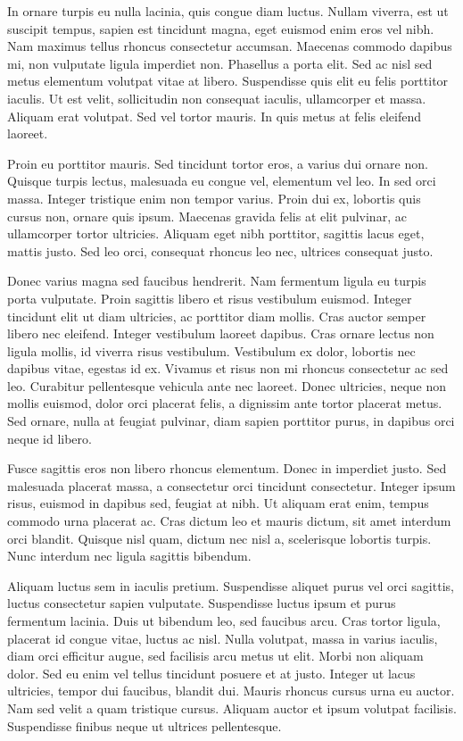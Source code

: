 \documentclass[a4paper,15pt]{article}
\begin{document}
In ornare turpis eu nulla lacinia, quis congue diam luctus. Nullam viverra, est ut suscipit tempus, sapien est tincidunt magna, eget euismod enim eros vel nibh. Nam maximus tellus rhoncus consectetur accumsan. Maecenas commodo dapibus mi, non vulputate ligula imperdiet non. Phasellus a porta elit. Sed ac nisl sed metus elementum volutpat vitae at libero. Suspendisse quis elit eu felis porttitor iaculis. Ut est velit, sollicitudin non consequat iaculis, ullamcorper et massa. Aliquam erat volutpat. Sed vel tortor mauris. In quis metus at felis eleifend laoreet.

Proin eu porttitor mauris. Sed tincidunt tortor eros, a varius dui ornare non. Quisque turpis lectus, malesuada eu congue vel, elementum vel leo. In sed orci massa. Integer tristique enim non tempor varius. Proin dui ex, lobortis quis cursus non, ornare quis ipsum. Maecenas gravida felis at elit pulvinar, ac ullamcorper tortor ultricies. Aliquam eget nibh porttitor, sagittis lacus eget, mattis justo. Sed leo orci, consequat rhoncus leo nec, ultrices consequat justo.

Donec varius magna sed faucibus hendrerit. Nam fermentum ligula eu turpis porta vulputate. Proin sagittis libero et risus vestibulum euismod. Integer tincidunt elit ut diam ultricies, ac porttitor diam mollis. Cras auctor semper libero nec eleifend. Integer vestibulum laoreet dapibus. Cras ornare lectus non ligula mollis, id viverra risus vestibulum. Vestibulum ex dolor, lobortis nec dapibus vitae, egestas id ex. Vivamus et risus non mi rhoncus consectetur ac sed leo. Curabitur pellentesque vehicula ante nec laoreet. Donec ultricies, neque non mollis euismod, dolor orci placerat felis, a dignissim ante tortor placerat metus. Sed ornare, nulla at feugiat pulvinar, diam sapien porttitor purus, in dapibus orci neque id libero.

Fusce sagittis eros non libero rhoncus elementum. Donec in imperdiet justo. Sed malesuada placerat massa, a consectetur orci tincidunt consectetur. Integer ipsum risus, euismod in dapibus sed, feugiat at nibh. Ut aliquam erat enim, tempus commodo urna placerat ac. Cras dictum leo et mauris dictum, sit amet interdum orci blandit. Quisque nisl quam, dictum nec nisl a, scelerisque lobortis turpis. Nunc interdum nec ligula sagittis bibendum.

Aliquam luctus sem in iaculis pretium. Suspendisse aliquet purus vel orci sagittis, luctus consectetur sapien vulputate. Suspendisse luctus ipsum et purus fermentum lacinia. Duis ut bibendum leo, sed faucibus arcu. Cras tortor ligula, placerat id congue vitae, luctus ac nisl. Nulla volutpat, massa in varius iaculis, diam orci efficitur augue, sed facilisis arcu metus ut elit. Morbi non aliquam dolor. Sed eu enim vel tellus tincidunt posuere et at justo. Integer ut lacus ultricies, tempor dui faucibus, blandit dui. Mauris rhoncus cursus urna eu auctor. Nam sed velit a quam tristique cursus. Aliquam auctor et ipsum volutpat facilisis. Suspendisse finibus neque ut ultrices pellentesque.
\end{document}
